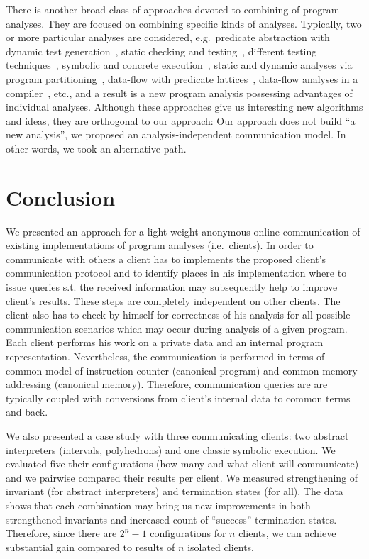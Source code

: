 \documentclass[envcountsame]{llncs}
\begin{document}
There is another broad class of approaches devoted to combining of program
analyses. They are focused on combining specific kinds of analyses. Typically,
two or more particular analyses are considered, e.g.~predicate abstraction with
dynamic test generation~\cite{SMASH}, static checking and
testing~\cite{CheckNCrash,StaticDynamic}, different testing
techniques~\cite{CombiningTesting}, symbolic and concrete
execution~\cite{Concolic}, static and dynamic analyses via program
partitioning~\cite{ProgramPartitioning}, data-flow with predicate
lattices~\cite{DataflowPredicates}, data-flow analyses in a
compiler~\cite{CombiningOptimisations,CompilerTranformations}, etc., and a
result is a new program analysis possessing advantages of individual analyses.
Although these approaches give us interesting new algorithms and ideas, they are
orthogonal to our approach: Our approach does not build ``a new analysis'', we
proposed an analysis-independent communication model. In other words, we took an
alternative path.



\section{Conclusion}
\label{sec:Conclusion}

We presented an approach for a light-weight anonymous online communication of
existing implementations of program analyses (i.e.~clients). In order to
communicate with others a client has to implements the proposed client's
communication protocol and to identify places in his implementation where to
issue queries s.t. the received information may subsequently help to improve
client's results. These steps are completely independent on other clients. The
client also has to check by himself for correctness of his analysis for all
possible communication scenarios which may occur during analysis of a given
program. Each client performs his work on a private data and an internal program
representation. Nevertheless, the communication is performed in terms of common
model of instruction counter (canonical program) and common memory addressing
(canonical memory). Therefore, communication queries are are typically coupled
with conversions from client's internal data to common terms and back.

We also presented a case study with three communicating clients: two abstract
interpreters (intervals, polyhedrons) and one classic symbolic execution. We
evaluated five their configurations (how many and what client will communicate)
and we pairwise compared their results per client. We measured strengthening of
invariant (for abstract interpreters) and termination states (for all). The data
shows that each combination may bring us new improvements in both strengthened
invariants and increased count of ``success'' termination states. Therefore,
since there are $ 2^n - 1 $ configurations for $ n $ clients, we can achieve
substantial gain compared to results of $ n $ isolated clients.
\end{document}
